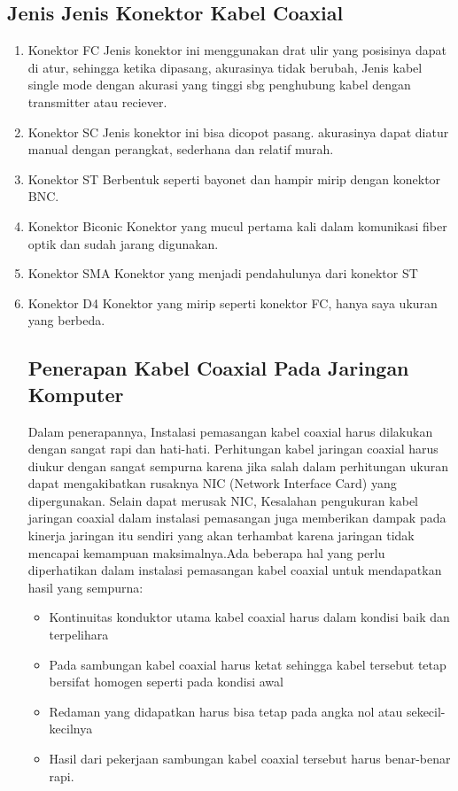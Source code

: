 \begin{itemize}
{\begin{itemize}
\begin{itemize}
	\subsection{Jenis Jenis Konektor Kabel Coaxial}
		\begin{enumerate}
			\item Konektor FC
			Jenis konektor ini menggunakan drat ulir yang posisinya dapat di atur, sehingga ketika dipasang, akurasinya tidak berubah, Jenis kabel single mode dengan akurasi yang tinggi sbg penghubung kabel dengan transmitter atau reciever.
			\item Konektor SC
			Jenis konektor ini bisa dicopot pasang. akurasinya dapat diatur manual dengan perangkat, sederhana dan relatif murah.
			\item Konektor ST
			Berbentuk seperti bayonet dan hampir mirip dengan konektor BNC.
			\item Konektor Biconic
			Konektor yang mucul pertama kali dalam komunikasi fiber optik dan sudah jarang digunakan.
			\item Konektor SMA
			Konektor yang menjadi pendahulunya dari konektor ST
			\item Konektor D4
			Konektor yang mirip seperti konektor FC, hanya saya ukuran yang berbeda.
			
	\subsection {Penerapan Kabel Coaxial Pada Jaringan Komputer}
	Dalam penerapannya, Instalasi pemasangan kabel coaxial harus dilakukan dengan sangat rapi dan hati-hati. Perhitungan kabel jaringan coaxial harus diukur dengan sangat sempurna karena jika salah dalam perhitungan ukuran dapat mengakibatkan rusaknya NIC (Network Interface Card) yang dipergunakan. Selain dapat merusak NIC, Kesalahan pengukuran kabel jaringan coaxial dalam instalasi pemasangan juga memberikan dampak pada kinerja jaringan itu sendiri yang akan terhambat karena jaringan tidak mencapai kemampuan maksimalnya.Ada beberapa hal yang perlu diperhatikan dalam instalasi pemasangan kabel coaxial untuk mendapatkan hasil yang sempurna:
		\begin{itemize}
			\item Kontinuitas konduktor utama kabel coaxial harus dalam kondisi baik dan terpelihara
			\item Pada sambungan kabel coaxial harus ketat sehingga kabel tersebut tetap bersifat homogen seperti pada kondisi awal
			\item Redaman yang didapatkan harus bisa tetap pada angka nol atau sekecil-kecilnya
			\item Hasil dari pekerjaan sambungan kabel coaxial tersebut harus benar-benar rapi.
		\end{itemize}
		

\end{enumerate}
\end{itemize}
\end{itemize}}
\end{itemize}
